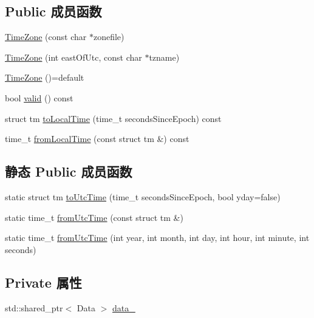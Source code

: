 \subsection*{Public 成员函数}
\begin{DoxyCompactItemize}
\item 
\hyperlink{classmuduo_1_1TimeZone_a2b0e6c8c73f2852fd044cb59b6df77a8}{Time\+Zone} (const char $\ast$zonefile)
\item 
\hyperlink{classmuduo_1_1TimeZone_aa462a0c14f5447827b6591048f9b15b5}{Time\+Zone} (int east\+Of\+Utc, const char $\ast$tzname)
\item 
\hyperlink{classmuduo_1_1TimeZone_aac02b2667c2bbf77fc3626d69e860111}{Time\+Zone} ()=default
\item 
bool \hyperlink{classmuduo_1_1TimeZone_a315419f26d3c59fa143b49b90a019049}{valid} () const
\item 
struct tm \hyperlink{classmuduo_1_1TimeZone_aef3172bc548b1486e453b35fc164b166}{to\+Local\+Time} (time\+\_\+t seconds\+Since\+Epoch) const
\item 
time\+\_\+t \hyperlink{classmuduo_1_1TimeZone_a46805409087a757eac75880a65a9bd04}{from\+Local\+Time} (const struct tm \&) const
\end{DoxyCompactItemize}
\subsection*{静态 Public 成员函数}
\begin{DoxyCompactItemize}
\item 
static struct tm \hyperlink{classmuduo_1_1TimeZone_a8be72968b00b0734d1be75a70bed969c}{to\+Utc\+Time} (time\+\_\+t seconds\+Since\+Epoch, bool yday=false)
\item 
static time\+\_\+t \hyperlink{classmuduo_1_1TimeZone_a33248c9e6e6b89a5ae6c4186daee24b1}{from\+Utc\+Time} (const struct tm \&)
\item 
static time\+\_\+t \hyperlink{classmuduo_1_1TimeZone_a33e04a26ea809b5500881782486f1115}{from\+Utc\+Time} (int year, int month, int day, int hour, int minute, int seconds)
\end{DoxyCompactItemize}
\subsection*{Private 属性}
\begin{DoxyCompactItemize}
\item 
std\+::shared\+\_\+ptr$<$ Data $>$ \hyperlink{classmuduo_1_1TimeZone_a49b7ab415f61f3a0b12ed185feb15b9f}{data\+\_\+}
\end{DoxyCompactItemize}
